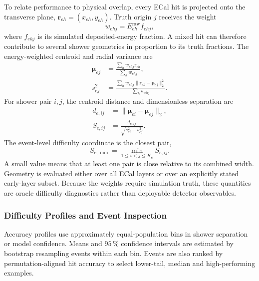 To relate performance to physical overlap, every ECal hit is projected onto
the transverse plane, \(\boldsymbol r_{eh}=(x_{eh},y_{eh})\). Truth origin
\(j\) receives the weight
\begin{equation}
    w_{ehj}=E_{eh}^{\mathrm{raw}}f_{ehj},
    \label{eq:shower_geometry_weight}
\end{equation}
where \(f_{ehj}\) is its simulated deposited-energy fraction. A mixed hit can
therefore contribute to several shower geometries in proportion to its truth
fractions. The energy-weighted centroid and radial variance are
\begin{align}
    \boldsymbol{\mu}_{ej}
    &=
    \frac{\sum_h w_{ehj}\boldsymbol r_{eh}}
         {\sum_h w_{ehj}},
    \label{eq:projected_shower_centroid} \\
    s_{ej}^{2}
    &=
    \frac{\sum_h w_{ehj}
    \lVert\boldsymbol r_{eh}-\boldsymbol\mu_{ej}\rVert_2^2}
         {\sum_h w_{ehj}}.
    \label{eq:projected_shower_width}
\end{align}
For shower pair \(i,j\), the centroid distance and dimensionless separation
are
\begin{align}
    d_{e,ij}
    &=
    \lVert\boldsymbol\mu_{ei}-\boldsymbol\mu_{ej}\rVert_2,
    \label{eq:shower_centroid_distance} \\
    S_{e,ij}
    &=
    \frac{d_{e,ij}}{\sqrt{s_{ei}^{2}+s_{ej}^{2}}}.
    \label{eq:normalised_shower_separation}
\end{align}
The event-level difficulty coordinate is the closest pair,
\begin{equation}
    S_{e,\min}=\min_{1\leq i<j\leq K_e}S_{e,ij}.
    \label{eq:min_shower_separation}
\end{equation}
A small value means that at least one pair is close relative to its combined
width. Geometry is evaluated either over all ECal layers or over an explicitly
stated early-layer subset. Because the weights require simulation truth, these
quantities are oracle difficulty diagnostics rather than deployable detector
observables.

\subsubsection{Difficulty Profiles and Event Inspection}

Accuracy profiles use approximately equal-population bins in shower
separation or model confidence. Means and \(95\,\%\) confidence intervals are
estimated by bootstrap resampling events within each bin. Events are also
ranked by permutation-aligned hit accuracy to select lower-tail, median and
high-performing examples.

